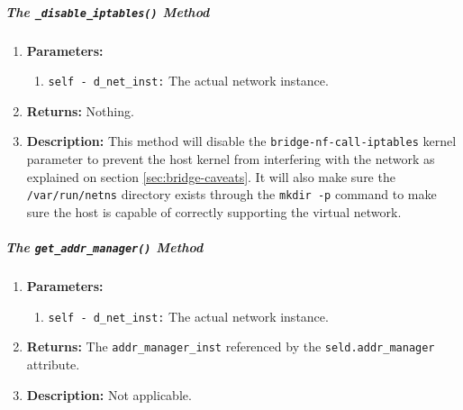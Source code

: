         \subparagraph{The \texttt{\_disable\_iptables()} Method}
            \begin{enumerate}
                \item \textbf{Parameters:}
                \begin{enumerate}
                    \item \texttt{self - d\_net\_inst:} The actual network instance.
                \end{enumerate}
                \item \textbf{Returns:} Nothing.
                \item \textbf{Description:} This method will disable the \texttt{bridge-nf-call-iptables} kernel parameter to prevent the host kernel from interfering with the network as explained on section \ref{sec:bridge-caveats}. It will also make sure the \texttt{/var/run/netns} directory exists through the \texttt{mkdir -p} command to make sure the host is capable of correctly supporting the virtual network.
            \end{enumerate}

        \subparagraph{The \texttt{get\_addr\_manager()} Method}
            \begin{enumerate}
                \item \textbf{Parameters:}
                \begin{enumerate}
                    \item \texttt{self - d\_net\_inst:} The actual network instance.
                \end{enumerate}
                \item \textbf{Returns:} The \texttt{addr\_manager\_inst} referenced by the \texttt{seld.addr\_manager} attribute.
                \item \textbf{Description:} Not applicable.
            \end{enumerate}

